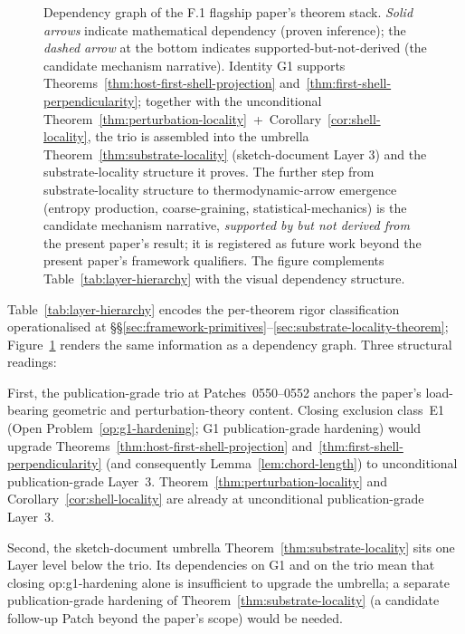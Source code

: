 \documentclass[11pt,letterpaper]{article}
\begin{document}
\begin{figure}[h]
\caption{Dependency graph of the F.1 flagship paper's theorem stack. \emph{Solid arrows} indicate mathematical dependency (proven inference); the \emph{dashed arrow} at the bottom indicates supported-but-not-derived (the candidate mechanism narrative). Identity G1 supports Theorems~\ref{thm:host-first-shell-projection} and~\ref{thm:first-shell-perpendicularity}; together with the unconditional Theorem~\ref{thm:perturbation-locality}~+~Corollary~\ref{cor:shell-locality}, the trio is assembled into the umbrella Theorem~\ref{thm:substrate-locality} (sketch-document Layer 3) and the substrate-locality structure it proves. The further step from substrate-locality structure to thermodynamic-arrow emergence (entropy production, coarse-graining, statistical-mechanics) is the candidate mechanism narrative, \emph{supported by but not derived from} the present paper's result; it is registered as future work beyond the present paper's framework qualifiers. The figure complements Table~\ref{tab:layer-hierarchy} with the visual dependency structure.}
\label{fig:dependency-graph}
\end{figure}

Table~\ref{tab:layer-hierarchy} encodes the per-theorem rigor classification operationalised at \S\S\ref{sec:framework-primitives}--\ref{sec:substrate-locality-theorem}; Figure~\ref{fig:dependency-graph} renders the same information as a dependency graph. Three structural readings:

First, the publication-grade trio at Patches~0550--0552 anchors the paper's load-bearing geometric and perturbation-theory content. Closing exclusion class~E1 (Open Problem~\ref{op:g1-hardening}; G1 publication-grade hardening) would upgrade Theorems~\ref{thm:host-first-shell-projection} and~\ref{thm:first-shell-perpendicularity} (and consequently Lemma~\ref{lem:chord-length}) to unconditional publication-grade Layer~3. Theorem~\ref{thm:perturbation-locality} and Corollary~\ref{cor:shell-locality} are already at unconditional publication-grade Layer~3.

Second, the sketch-document umbrella Theorem~\ref{thm:substrate-locality} sits one Layer level below the trio. Its dependencies on G1 and on the trio mean that closing op:g1-hardening alone is insufficient to upgrade the umbrella; a separate publication-grade hardening of Theorem~\ref{thm:substrate-locality} (a candidate follow-up Patch beyond the paper's scope) would be needed.
\end{document}
